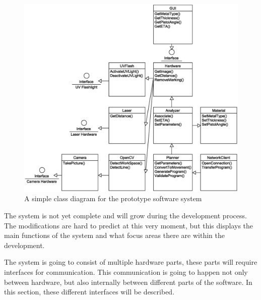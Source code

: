 \begin{figure}[h!]
\centering
\includegraphics[width=\textwidth]{graphics/Prototype}
\caption{A simple class diagram for the prototype software system}
\label{ClassDiagram}
\end{figure}


The system is not yet complete and will grow during the development process. The modifications are hard to predict at this very moment, but this displays the main functions of the system and what focus areas there are within the development. 

The system is going to consist of multiple hardware parts, these parts will require interfaces for communication. This communication is going to happen not only between hardware, but also internally between different parts of the software.
In this section, these different interfaces will be described. 

